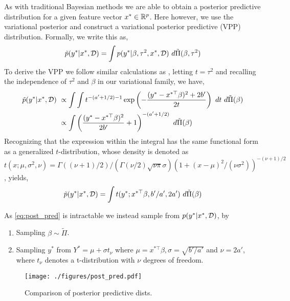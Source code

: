 As with traditional Bayesian methods we are able to obtain a posterior predictive distribution for a given feature vector $x^\ast \in \mathbb{R}^p$. Here however, we use the variational posterior and construct a variational posterior predictive (VPP) distribution. Formally, we write this as,
\begin{equation} \label{eq:variational_pp} 
    \tilde{p} (y^\ast | x^\ast, \mathcal{D}) 
	= \int p(y^\ast | \beta, \tau^2, x^\ast, \mathcal{D}) \ d\tilde{\Pi}(\beta, \tau^2)
\end{equation}
To derive the VPP we follow similar calculations as \cite{Murphy2007}, letting $t = \tau^2$ and recalling the independence of $\tau^2$ and $\beta$ in our variational family, we have,
\begin{align}
    \tilde{p} (y^\ast | x^\ast, \mathcal{D}) 
    &\ \propto
    \int \int t^{-(a' + 1/2) -1} \exp \left( - \frac{(y^\ast - x^{\ast \top} \beta)^2 + 2b'}{2 t} \right)
    \ dt \ d\tilde{\Pi}(\beta)
    \nonumber
    \\
    &\ \propto
    \int \left(\frac{(y^\ast - x^{\ast \top} \beta)^2}{2b'} + 1 \right)^{-(a' + 1/2)} \ d\tilde{\Pi}(\beta)
    \nonumber
\end{align}
Recognizing that the expression within the integral has the same functional form as a generalized $t$-distribution, whose density is denoted as $t(x; \mu, \sigma^2, \nu) = \Gamma((\nu + 1)/2) / (\Gamma(\nu / 2) \sqrt{\nu \pi} \sigma) (1+ (x-\mu)^2/(\nu \sigma^2))^{-(\nu+1)/2}$, yields,
\begin{equation} \label{eq:post_pred} 
    \tilde{p} (y^\ast | x^\ast, \D) 
	= \int t(y^\ast; x^{\ast \top} \beta, b'/a', 2a') \ d\tilde{\Pi}(\beta)
\end{equation}

As \eqref{eq:post_pred} is intractable we instead sample from $p(y^\ast | x^\ast, \mathcal{D})$, by
\begin{enumerate}
    \itemsep0em
    \item Sampling $\beta \sim \tilde{\Pi}$.
    \item Sampling $y^\ast$ from $Y^\ast = \mu + \sigma t_\nu$ where $\mu = x^{\ast \top} \beta, \sigma = \sqrt{b'/a'}$ and $\nu = 2a'$, where $t_\nu$ denotes a t-distribution with $\nu$ degrees of freedom.
\end{enumerate}

\begin{figure}[htp]
    \centering
    \texttt{[image: ./figures/post\_pred.pdf]}
    \caption{Comparison of posterior predictive dists.}
    \label{fig:poster_pred}
\end{figure}

